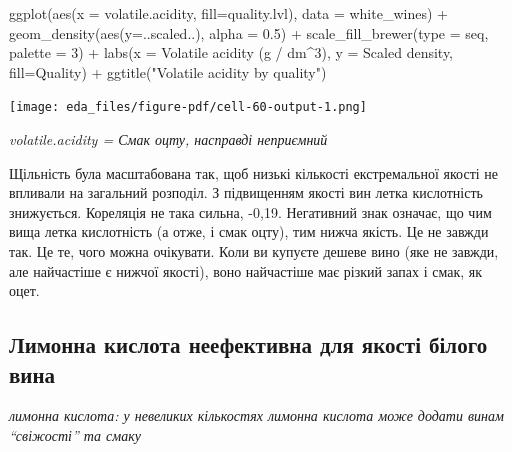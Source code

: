 \documentclass[
  letterpaper,
  DIV=11,
  numbers=noendperiod]{scrreprt}
\newenvironment{Shaded}{\begin{snugshade}}{\end{snugshade}}
\newcommand{\AttributeTok}[1]{\textcolor[rgb]{0.40,0.45,0.13}{#1}}
\newcommand{\DecValTok}[1]{\textcolor[rgb]{0.68,0.00,0.00}{#1}}
\newcommand{\FloatTok}[1]{\textcolor[rgb]{0.68,0.00,0.00}{#1}}
\newcommand{\FunctionTok}[1]{\textcolor[rgb]{0.28,0.35,0.67}{#1}}
\newcommand{\NormalTok}[1]{\textcolor[rgb]{0.00,0.23,0.31}{#1}}
\newcommand{\SpecialCharTok}[1]{\textcolor[rgb]{0.37,0.37,0.37}{#1}}
\newcommand{\StringTok}[1]{\textcolor[rgb]{0.13,0.47,0.30}{#1}}
\begin{document}
\begin{Shaded}
\begin{Highlighting}[]
\FunctionTok{ggplot}\NormalTok{(}\FunctionTok{aes}\NormalTok{(}\AttributeTok{x =}\NormalTok{ volatile.acidity, }\AttributeTok{fill=}\NormalTok{quality.lvl), }\AttributeTok{data =}\NormalTok{ white\_wines) }\SpecialCharTok{+}
  \FunctionTok{geom\_density}\NormalTok{(}\FunctionTok{aes}\NormalTok{(}\AttributeTok{y=}\NormalTok{..scaled..), }\AttributeTok{alpha =} \FloatTok{0.5}\NormalTok{) }\SpecialCharTok{+}
  \FunctionTok{scale\_fill\_brewer}\NormalTok{(}\AttributeTok{type =} \StringTok{\textquotesingle{}seq\textquotesingle{}}\NormalTok{, }\AttributeTok{palette =} \DecValTok{3}\NormalTok{) }\SpecialCharTok{+}
  \FunctionTok{labs}\NormalTok{(}\AttributeTok{x =} \StringTok{\textquotesingle{}Volatile acidity (g / dm\^{}3)\textquotesingle{}}\NormalTok{, }
       \AttributeTok{y =} \StringTok{\textquotesingle{}Scaled density\textquotesingle{}}\NormalTok{,  }
       \AttributeTok{fill=}\StringTok{\textquotesingle{}Quality\textquotesingle{}}\NormalTok{) }\SpecialCharTok{+}
  \FunctionTok{ggtitle}\NormalTok{(}\StringTok{"Volatile acidity by quality"}\NormalTok{)}
\end{Highlighting}
\end{Shaded}

\texttt{[image: eda\_files/figure-pdf/cell-60-output-1.png]}

\emph{volatile.acidity = Смак оцту, насправді неприємний}

Щільність була масштабована так, щоб низькі кількості екстремальної
якості не впливали на загальний розподіл. З підвищенням якості вин летка
кислотність знижується. Кореляція не така сильна, -0,19. Негативний знак
означає, що чим вища летка кислотність (а отже, і смак оцту), тим нижча
якість. Це не завжди так. Це те, чого можна очікувати. Коли ви купуєте
дешеве вино (яке не завжди, але найчастіше є нижчої якості), воно
найчастіше має різкий запах і смак, як оцет.

\subsection{Лимонна кислота неефективна для якості білого
вина}\label{ux43bux438ux43cux43eux43dux43dux430-ux43aux438ux441ux43bux43eux442ux430-ux43dux435ux435ux444ux435ux43aux442ux438ux432ux43dux430-ux434ux43bux44f-ux44fux43aux43eux441ux442ux456-ux431ux456ux43bux43eux433ux43e-ux432ux438ux43dux430}

\emph{лимонна кислота: у невеликих кількостях лимонна кислота може
додати винам ``свіжості'' та смаку}
\end{document}
